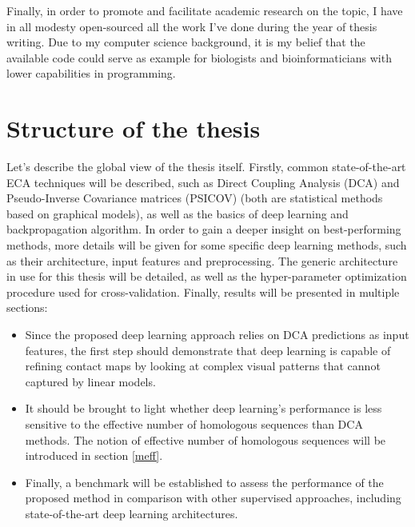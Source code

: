    Finally, in order to promote and facilitate academic research on the topic, I have in all modesty
    open-sourced all the work I've done during the year of thesis writing.
    Due to my computer science background, it is my belief that the
    available code could serve as example for biologists and bioinformaticians
    with lower capabilities in programming.

\section{Structure of the thesis}

    Let's describe the global view of the thesis itself.
    Firstly, common state-of-the-art ECA techniques will be described, such as Direct Coupling Analysis (DCA)
    and Pseudo-Inverse Covariance matrices (PSICOV) (both are statistical methods based on graphical models),
    as well as the basics of deep learning and backpropagation algorithm.
    In order to gain a deeper insight on best-performing methods, more details will be given for
    some specific deep learning methods, such as their architecture, input features and preprocessing.
    The generic architecture in use for this thesis will be detailed, as well as the hyper-parameter
    optimization procedure used for cross-validation.
    Finally, results will be presented in multiple sections:
    \begin{itemize}
        \item Since the proposed deep learning approach relies on DCA predictions as input features,
        the first step should demonstrate that deep learning is capable of refining
        contact maps by looking at complex visual patterns that cannot captured by linear models.
        \item It should be brought to light whether deep learning's performance is less sensitive to the effective
        number of homologous sequences than DCA methods. The notion of effective number of homologous sequences
        will be introduced in section \ref{meff}.
        \item Finally, a benchmark will be established to assess the performance of the proposed method
        in comparison with other supervised approaches, including state-of-the-art deep learning architectures.
    \end{itemize}
